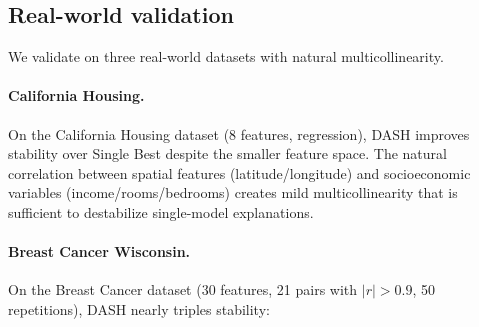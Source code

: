 \documentclass[11pt]{article}
\newcommand{\dash}{\textsc{DASH}}
\begin{document}
\subsection{Real-world validation}
\label{sec:realworld}

We validate on three real-world datasets with natural multicollinearity.

\paragraph{California Housing.}
On the California Housing dataset (8 features, regression), \dash{} improves
stability over Single Best despite the smaller feature space. The natural
correlation between spatial features (latitude/longitude) and socioeconomic
variables (income/rooms/bedrooms) creates mild multicollinearity that is
sufficient to destabilize single-model explanations.

\paragraph{Breast Cancer Wisconsin.}
On the Breast Cancer dataset (30 features, 21 pairs with $|r| > 0.9$,
50 repetitions), \dash{} nearly triples stability:
\end{document}
